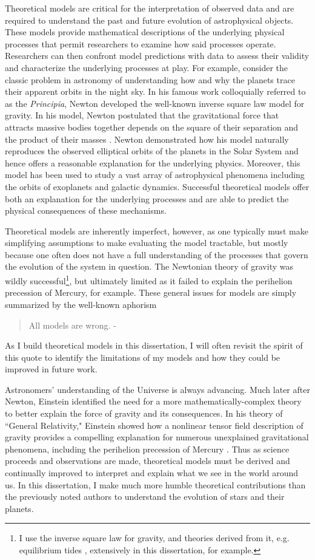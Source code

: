 Theoretical models are critical for the interpretation of observed data and are required to understand the past and future evolution of astrophysical objects. These models provide mathematical descriptions of the underlying physical processes that permit researchers to examine how said processes operate. Researchers can then confront model predictions with data to assess their validity and characterize the underlying processes at play. For example, consider the classic problem in astronomy of understanding how and why the planets trace their apparent orbits in the night sky. In his famous work colloquially referred to as the \textit{Principia}, Newton developed the well-known inverse square law model for gravity. In his model, Newton postulated that the gravitational force that attracts massive bodies together depends on the square of their separation and the product of their masses \citep{Newton1687,Newton1999}. Newton demonstrated how his model naturally reproduces the observed elliptical orbits of the planets in the Solar System and hence offers a reasonable explanation for the underlying physics. Moreover, this model has been used to study a vast array of astrophysical phenomena including the orbits of exoplanets and galactic dynamics. Successful theoretical models offer both an explanation for the underlying processes and are able to predict the physical consequences of these mechanisms.

Theoretical models are inherently imperfect, however, as one typically must make simplifying assumptions to make evaluating the model tractable, but mostly because one often does not have a full understanding of the processes that govern the evolution of the system in question. The Newtonian theory of gravity was wildly successful\footnote{I use the inverse square law for gravity, and theories derived from it, e.g. equilibrium tides \citep{Darwin1880}, extensively in this dissertation, for example.}, but ultimately limited as it failed to explain the perihelion precession of Mercury, for example. These general issues for models are simply summarized by the well-known aphorism
\begin{quote}
All models are wrong. - \citet{Box1976}
\end{quote}
As I build theoretical models in this dissertation, I will often revisit the spirit of this quote to identify the limitations of my models and how they could be improved in future work.

Astronomers' understanding of the Universe is always advancing. Much later after Newton, Einstein identified the need for a more mathematically-complex theory to better explain the force of gravity and its consequences. In his theory of ``General Relativity," Einstein showed how a nonlinear tensor field description of gravity provides a compelling explanation for numerous unexplained gravitational phenomena, including the perihelion precession of Mercury \citep{Einstein1915b,Einstein1915a}. Thus as science proceeds and observations are made, theoretical models must be derived and continually improved to interpret and explain what we see in the world around us. In this dissertation, I make much more humble theoretical contributions than the previously noted authors to understand the evolution of stars and their planets. 

